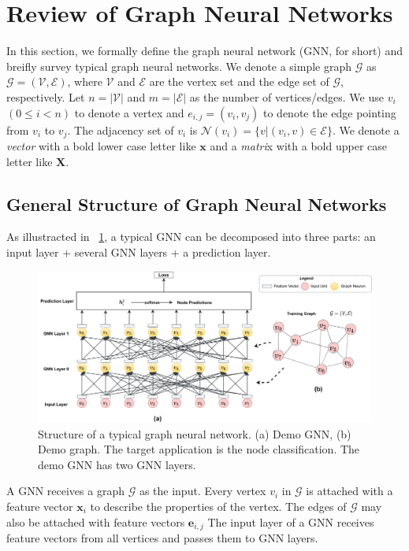 \section{Review of Graph Neural Networks}

In this section, we formally define the graph neural network (GNN, for short) and breifly survey typical graph neural networks.
We denote a simple graph $\mathcal{G}$ as $\mathcal{G}=(\mathcal{V}, \mathcal{E})$, where $\mathcal{V}$ and $\mathcal{E}$ are the vertex set and the edge set of $\mathcal{G}$, respectively.
Let $n=|\mathcal{V}|$ and $m=|\mathcal{E}|$ as the number of vertices/edges.
We use $v_i$ $(0 \leq i < n)$ to denote a vertex and $e_{i,j}=(v_i, v_j)$ to denote the edge pointing from $v_i$ to $v_j$.
The adjacency set of $v_i$ is $\mathcal{N}(v_i)=\{v|(v_i, v) \in \mathcal{E}\}$.
We denote a \emph{vector} with a bold lower case letter like $\boldsymbol{x}$ and a \emph{matri}x with a bold upper case letter like $\boldsymbol{X}$.

\subsection{General Structure of Graph Neural Networks}

As illustracted in \figurename~\ref{fig:general_structure_of_gnn}, a typical GNN can be decomposed into three parts: an input layer + several GNN layers + a prediction layer.

\begin{figure}
	\centering
	\includegraphics[width=1\columnwidth]{figs/illustration/GNN_common_architecture.png}
	\caption{Structure of a typical graph neural network. (a) Demo GNN, (b) Demo graph. The target application is the node classification. The demo GNN has two GNN layers.}
	\label{fig:general_structure_of_gnn}
\end{figure}

A GNN receives a graph $\mathcal{G}$ as the input.
Every vertex $v_i$ in $\mathcal{G}$ is attached with a feature vector $\boldsymbol{x}_i$ to describe the properties of the vertex.
The edges of $\mathcal{G}$ may also be attached with feature vectors $\boldsymbol{e}_{i,j}$
The input layer of a GNN receives feature vectors from all vertices and passes them to GNN layers.

